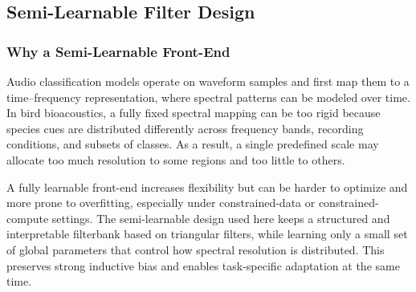 \documentclass[a4paper,singleside,12pt]{report} %
\begin{document}
	\subsection{Semi-Learnable Filter Design}
	\label{sec:semi_learnable_filter_design}
	\subsubsection{Why a Semi-Learnable Front-End}
	Audio classification models operate on waveform samples and first map them to a time--frequency representation, where spectral patterns can be modeled over time. In bird bioacoustics, a fully fixed spectral mapping can be too rigid because species cues are distributed differently across frequency bands, recording conditions, and subsets of classes. As a result, a single predefined scale may allocate too much resolution to some regions and too little to others.

	A fully learnable front-end increases flexibility but can be harder to optimize and more prone to overfitting, especially under constrained-data or constrained-compute settings. The semi-learnable design used here keeps a structured and interpretable filterbank based on triangular filters, while learning only a small set of global parameters that control how spectral resolution is distributed. This preserves strong inductive bias and enables task-specific adaptation at the same time.
\end{document}
